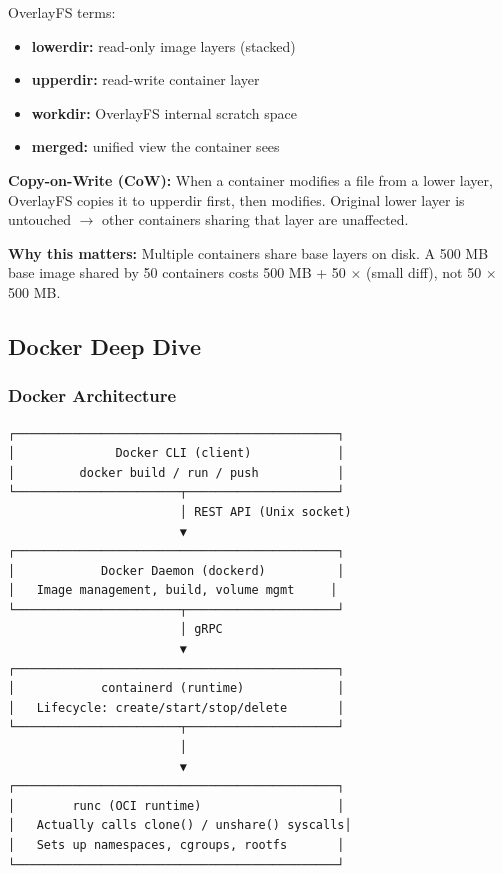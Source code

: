 \documentclass[11pt]{article}
\providecommand{\tightlist}{\setlength{\itemsep}{1pt}\setlength{\parskip}{0pt}}
\begin{document}
OverlayFS terms:

\begin{itemize}
\tightlist
\item
  \textbf{lowerdir:} read-only image layers (stacked)
\item
  \textbf{upperdir:} read-write container layer
\item
  \textbf{workdir:} OverlayFS internal scratch space
\item
  \textbf{merged:} unified view the container sees
\end{itemize}

\textbf{Copy-on-Write (CoW):} When a container modifies a file from a lower layer, OverlayFS copies it to upperdir first, then modifies. Original lower layer is untouched \(\rightarrow\) other containers sharing that layer are unaffected.

\textbf{Why this matters:} Multiple containers share base layers on disk. A 500 MB base image shared by 50 containers costs 500 MB + 50 \(\times\) (small diff), not 50 \(\times\) 500 MB.

\subsection{Docker Deep Dive}\label{docker-deep-dive}

\subsubsection{Docker Architecture}\label{docker-architecture}

\setcodelang{}

\begin{verbatim}
┌─────────────────────────────────────────────┐
│              Docker CLI (client)            │
│         docker build / run / push           │
└───────────────────────┬─────────────────────┘
                        │ REST API (Unix socket)
                        ▼
┌─────────────────────────────────────────────┐
│            Docker Daemon (dockerd)          │
│   Image management, build, volume mgmt     │
└───────────────────────┬─────────────────────┘
                        │ gRPC
                        ▼
┌─────────────────────────────────────────────┐
│            containerd (runtime)             │
│   Lifecycle: create/start/stop/delete       │
└───────────────────────┬─────────────────────┘
                        │
                        ▼
┌─────────────────────────────────────────────┐
│        runc (OCI runtime)                   │
│   Actually calls clone() / unshare() syscalls│
│   Sets up namespaces, cgroups, rootfs       │
└─────────────────────────────────────────────┘
\end{verbatim}
\end{document}
